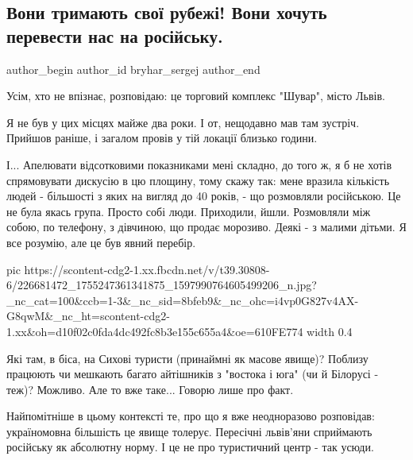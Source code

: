  
 
 
 
 
 
\subsection{Вони тримають свої рубежі! Вони хочуть перевести нас на російську.}
\label{sec:02_08_2021.fb.bryhar_sergej.1.lvov_jazyk}
 
\ifcmt
 author_begin
   author_id bryhar_sergej
 author_end
\fi

Усім, хто не впізнає, розповідаю: це торговий комплекс "Шувар", місто Львів. 

Я не був у цих місцях майже два роки. І от, нещодавно мав там зустріч. Прийшов
раніше, і загалом провів у тій локації близько години. 

І... Апелювати відсотковими показниками мені складно, до того ж, я б не хотів
спрямовувати дискусію в цю площину, тому скажу так: мене вразила кількість
людей - більшості з яких на вигляд до 40 років, - що розмовляли російською. Це
не була якась група. Просто собі люди. Приходили, йшли. Розмовляли між собою,
по телефону, з дівчиною, що продає морозиво. Деякі - з малими дітьми. Я все
розумію, але це був явний перебір.

\ifcmt
  pic https://scontent-cdg2-1.xx.fbcdn.net/v/t39.30808-6/226681472_1755247361341875_1597990764605499206_n.jpg?_nc_cat=100&ccb=1-3&_nc_sid=8bfeb9&_nc_ohc=i4vp0G827v4AX-G8qwM&_nc_ht=scontent-cdg2-1.xx&oh=d10f02c0fda4dc492fc8b3e155c655a4&oe=610FE774
  width 0.4
\fi

Які там, в біса, на Сихові туристи (принаймні як масове явище)? Поблизу
працюють чи мешкають багато айтішників з "востока і юга" (чи й Білорусі - теж)?
Можливо. Але то вже таке... Говорю лише про факт.

Найпомітніше в цьому контексті те, про що я вже неодноразово розповідав:
україномовна більшість це явище толерує. Пересічні львів'яни сприймають
російську як абсолютну норму. І це не про туристичний центр - так усюди.

